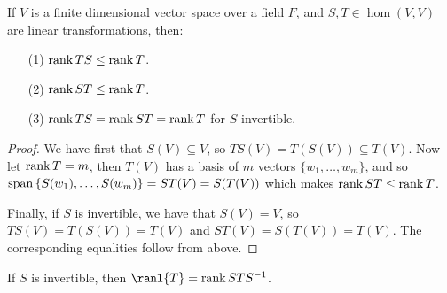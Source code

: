 \begin{lemma}\label{3.1.9}
    If $V$ is a finite dimensional vector space over a field  $F$, and  $S,T \in
    \hom{(V,V)}$ are linear transformations, then:
    \begin{enumerate}
        \item[(1)] $\operatorname{rank}{TS} \leq \operatorname{rank}{T}$.

        \item[(2)] $\operatorname{rank}{ST} \leq \operatorname{rank}{T}$.

        \item[(3)]  $\operatorname{rank}{TS}=\operatorname{rank}{ST}=\operatorname{rank}{T}$ for $S$ invertible.
    \end{enumerate}
\end{lemma}
\begin{proof}
    We have first that $S(V) \subseteq V$, so $TS(V)=T(S(V)) \subseteq T(V)$.
    Now let $\operatorname{rank}{T}=m$, then $T(V)$ has a basis of $m$ vectors  $\{w_1, \dots,
    w_m\}$, and so $\operatorname{span}{\{S(w_1), \dots, S(w_m)\}}=ST(V)=S(T(V))$ which makes
    $\operatorname{rank}{ST} \leq \operatorname{rank}{T}$.
    
    Finally, if $S$ is invertible, we have that  $S(V)=V$, so
    $TS(V)=T(S(V))=T(V)$ and $ST(V)=S(T(V))=T(V)$. The corresponding equalities
    follow from above.
\end{proof}
\begin{corollary}
    If $S$ is invertible, then  $\ranl{T}=\rank{STS^{-1}}$.
\end{corollary}
